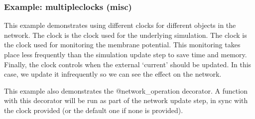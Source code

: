 \documentclass[letterpaper,10pt,english]{manual}
\begin{document}
\hypertarget{index-55}{}\subsubsection{Example: multipleclocks (misc)}

This example demonstrates using different clocks for different objects
in the network. The clock  is the clock used for the
underlying simulation. The clock  is the clock used for
monitoring the membrane potential. This monitoring takes place less
frequently than the simulation update step to save time and memory.
Finally, the clock  controls when the external `current'
 should be updated. In this  case, we update it infrequently
so we can see the effect on the network.

This example also demonstrates the @network\_operation decorator. A
function with this decorator will be run as part of the network
update step, in sync with the clock provided (or the default one
if none is provided).
\end{document}

